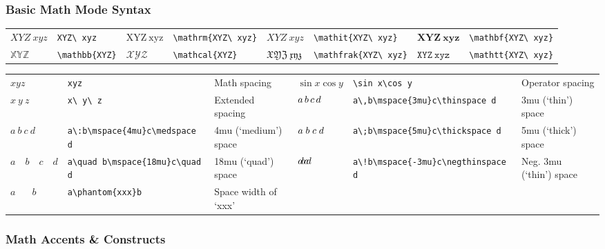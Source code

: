 \documentclass[10pt, english]{article}
\begin{document}
\subsubsection*{Basic Math Mode Syntax}

	\begin{center}
		\scriptsize
	\begin{tabular}{ll|ll|ll|ll}
		$XYZ\ xyz$ & \verb|XYZ\ xyz| & $\mathrm{XYZ\ xyz}$ & \verb|\mathrm{XYZ\ xyz}| & $\mathit{XYZ\ xyz}$ & \verb|\mathit{XYZ\ xyz}| & $\mathbf{XYZ\ xyz}$ & \verb|\mathbf{XYZ\ xyz}|\\
		$\mathbb{XYZ}$ & \verb|\mathbb{XYZ}| & $\mathcal{XYZ}$ & \verb|\mathcal{XYZ}| & $\mathfrak{XYZ\ xyz}$ & \verb|\mathfrak{XYZ\ xyz}| & $\mathtt{XYZ\ xyz}$ & \verb|\mathtt{XYZ\ xyz}|\\
	\end{tabular}
	\end{center}

	\begin{center}
		\scriptsize
	\begin{tabular}{lll|lll}
		$xyz$ & \verb|xyz| & Math spacing & $\sin x\cos y$ & \verb|\sin x\cos y| & Operator spacing\\
		$x\ y\ z$ & \verb|x\ y\ z| & Extended spacing & $a\,b\mspace{3mu}c\thinspace d$ & \verb|a\,b\mspace{3mu}c\thinspace d| & 3mu (`thin') space\\
		$a\:b\mspace{4mu}c\medspace d$ & \verb|a\:b\mspace{4mu}c\medspace d| & 4mu (`medium') space & $a\;b\mspace{5mu}c\thickspace d$ & \verb|a\;b\mspace{5mu}c\thickspace d| & 5mu (`thick') space\\
		$a\quad b\mspace{18mu}c\quad d$ & \verb|a\quad b\mspace{18mu}c\quad d| & 18mu (`quad') space & $a\!b\mspace{-3mu}c\negthinspace d$ & \verb|a\!b\mspace{-3mu}c\negthinspace d| & Neg. 3mu (`thin') space\\
		$a\phantom{xxx}b$ & \verb|a\phantom{xxx}b| & Space width of `xxx'\\
	\end{tabular}
	\end{center}

\subsubsection*{Math Accents \& Constructs}
\end{document}
